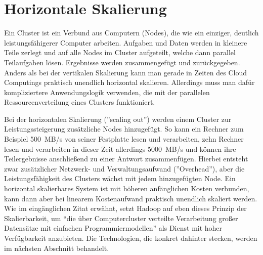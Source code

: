\section{Horizontale Skalierung}
Ein Cluster ist ein Verbund aus Computern (Nodes), die wie ein einziger, deutlich leistungsfähigerer Computer arbeiten. Aufgaben und Daten werden in kleinere Teile zerlegt und auf alle Nodes im Cluster aufgeteilt, welche dann parallel Teilaufgaben lösen. Ergebnisse werden zusammengefügt und zurückgegeben. Anders als bei der vertikalen Skalierung kann man gerade in Zeiten des Cloud Computings praktisch unendlich horizontal skalieren. Allerdings muss man dafür kompliziertere Anwendungslogik verwenden, die mit der parallelen Ressourcenverteilung eines Clusters funktioniert.\cite{noauthor_what_nodate} 
\par
Bei der horizontalen Skalierung (''scaling out'') werden einem Cluster zur Leistungssteigerung zusätzliche Nodes hinzugefügt. So kann ein Rechner zum Beispiel 500 MB/s von seiner Festplatte lesen und verarbeiten, zehn Rechner lesen und verarbeiten in dieser Zeit allerdings 5000 MB/s und können ihre Teilergebnisse anschließend zu einer Antwort zusammenfügen. Hierbei entsteht zwar zusätzlicher Netzwerk- und Verwaltungsaufwand (''Overhead''), aber die Leistungsfähigkeit des Clusters wächst mit jedem hinzugefügten Node. Ein horizontal skalierbares System ist mit höheren anfänglichen Kosten verbunden, kann dann aber bei linearem Kostenaufwand praktisch unendlich skaliert werden.\cite{noauthor_horizontal_nodate}\\
Wie im eingänglichen Zitat erwähnt, setzt Hadoop auf eben dieses Prinzip der Skalierbarkeit, um ``die über Computercluster verteilte Verarbeitung großer Datensätze mit einfachen Programmiermodellen''\cite{noauthor_apache_nodate} als Dienst mit hoher Verfügbarkeit anzubieten. Die Technologien, die konkret dahinter stecken, werden im nächsten Abschnitt behandelt.


